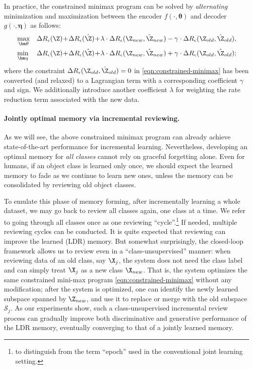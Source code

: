 \documentclass[../../book-main.tex]{subfiles}
\begin{document}
In practice, the constrained minimax program can be solved by {\em alternating} minimization and maximization between the encoder $f(\cdot, \bm \theta)$ and decoder $g(\cdot, \bm \eta)$ as follows:
\begin{eqnarray}
&\max_{\bm \theta}  &\Delta{R_\epsilon(\Z)}\!+\!\Delta{R_\epsilon(\hat{\Z})}\!+\!\lambda\cdot  \Delta{R_\epsilon(\Z_{new},\hat{\Z}_{new})} - \gamma\cdot \Delta{R_\epsilon(\Z_{old},\hat{\Z}_{old})}, \label{eqn:relaxed-max}\\ 
&\min_{\bm \eta} &\Delta{R_\epsilon(\Z)}\!+\!\Delta{R_\epsilon(\hat{\Z})}\!+\!\lambda\cdot \Delta{R_\epsilon(\Z_{new},\hat{\Z}_{new})} + \gamma\cdot \Delta{R_\epsilon(\Z_{old},\hat{\Z}_{old})}; \label{eqn:relaxed-min}
\end{eqnarray}
where the constraint $\Delta R_\epsilon(\Z_{old},\hat{\Z}_{old}) = 0$ in \eqref{eqn:constrained-minimax} has been converted (and relaxed) to a Lagrangian term with a corresponding coefficient $\gamma$ and sign. We additionally introduce another coefficient $\lambda$ for weighting the rate reduction term associated with the new data.



\paragraph{Jointly optimal memory via incremental reviewing.} 
As we will see, the above constrained minimax program can already achieve state-of-the-art performance for incremental learning. Nevertheless, developing an optimal memory for {\em all classes} cannot rely on graceful forgetting alone. Even for humans, if an object class is learned only once, we should expect the learned memory to fade as we continue to learn new ones, unless the memory can be consolidated by reviewing old object classes. %

To emulate this phase of memory forming, after incrementally learning a whole dataset, we may go back to review all classes again, one class at a time. We refer to going through all classes once as one reviewing ``cycle''.\footnote{to distinguish from the term ``epoch'' used in the conventional joint learning setting.} If needed, multiple reviewing cycles can be conducted. It is quite expected that reviewing can improve the learned (LDR) memory. But somewhat surprisingly, the closed-loop framework allows us to review even in a ``{class-unsupervised}'' manner: when reviewing data of an old class, say $\X_j$, the system does not need the class label and can simply treat $\X_j$ as a new class $\X_{new}$. That is, the system optimizes the same constrained mini-max program \eqref{eqn:constrained-minimax} without any modification; after the system is optimized, one can identify the newly learned subspace spanned by $\Z_{new}$, and use it to replace or merge with the old subspace $\mathcal{S}_j$. As our experiments show, such a class-unsupervised incremental review process can gradually improve both discriminative and generative performance of the LDR memory, eventually converging to that of a jointly learned memory.
\end{document}

